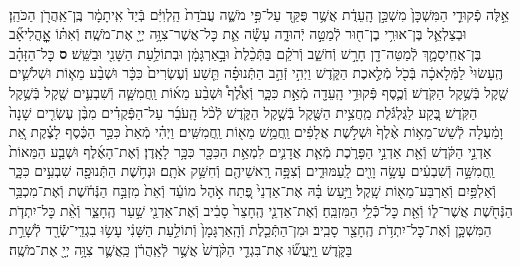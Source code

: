 \documentclass[twoside, openany, parskip=half, 11pt]{book}
\begin{document}
\begin{footnotesize}
\begin{multicols}{2}
\\
אֵ֣לֶּה פְֿקוּדֵ֤י הַמִּשְׁכָּן֙ מִשְׁכַּ֣ן הָֽעֵדֻ֔ת אֲשֶׁ֥ר פֻּקַּ֖ד עַל־פִּ֣י מֹשֶׁ֑ה עֲבֹדַת֙ הַֽלְוִיִּ֔ם בְּֿיַד֙ אִֽיתָמָ֔ר בֶּֽן־אַֽהֲרֹ֖ן הַכֹּהֵֽן׃ וּבְצַלְאֵ֛ל בֶּן־אוּרִ֥י בֶן־ח֖וּר לְֿמַטֵּ֣ה יְֿהוּדָ֑ה עָשָׂ֕ה אֵ֛ת כׇּל־אֲשֶׁר־צִוָּ֥ה יְיָ֖ אֶת־מֹשֶֽׁה׃ וְֿאִתּ֗וֹ אׇׇׇׇׇׇׇׇׇׇׇׇׇׇׇׇׇׇָֽהֳלִיאָ֞ב בֶּן־אֲחִֽיסָמָ֛ךְ לְֿמַטֵּה־דָ֖ן חָרָ֣שׁ וְֿחֹשֵׁ֑ב וְֿרֹקֵ֗ם בַּתְּֿכֵ֨לֶת֙ וּבָ֣אַרְגָּמָ֔ן וּבְתוֹלַ֥עַת הַשָּׁנִ֖י וּבַשֵּֽׁשׁ׃ \textbf{ס}  כׇּל־הַזָּהָ֗ב הֶֽעָשׂוּי֙ לַמְּֿלָאכָ֔ה בְּֿכֹ֖ל מְֿלֶ֣אכֶת הַקֹּ֑דֶשׁ וַיְהִ֣י זְֿהַ֣ב הַתְּֿנוּפָ֗ה תֵּ֤שַׁע וְֿעֶשְׂרִים֙ כִּכָּ֔ר וּשְׁבַ֨ע מֵא֧וֹת וּשְׁלֹשִׁ֛ים שֶׁ֖קֶל בְּֿשֶׁ֥קֶל הַקֹּֽדֶשׁ׃ וְֿכֶ֛סֶף פְּֿקוּדֵ֥י הָֽעֵדָ֖ה מְֿאַ֣ת כִּכָּ֑ר וְֿאֶ֩לֶף֩ וּשְׁבַ֨ע מֵא֜וֹת וַֽחֲמִשָּׁ֧ה וְֿשִׁבְעִ֛ים שֶׁ֖קֶל בְּֿשֶׁ֥קֶל הַקֹּֽדֶשׁ׃ בֶּ֚קַע לַגֻּלְגֹּ֔לֶת מַֽחֲצִ֥ית הַשֶּׁ֖קֶל בְּֿשֶׁ֣קֶל הַקֹּ֑דֶשׁ לְֿכֹ֨ל הָֽעֹבֵ֜ר עַל־הַפְּֿקֻדִ֗ים מִבֶּ֨ן עֶשְׂרִ֤ים שָׁנָה֙ וָמַ֔עְלָה לְֿשֵׁשׁ־מֵא֥וֹת אֶ֨לֶף֙ וּשְׁלֹ֣שֶׁת אֲלָפִ֔ים וַֽחֲמֵ֥שׁ מֵא֖וֹת וַֽחֲמִשִּֽׁים׃ וַיְהִ֗י מְֿאַת֙ כִּכַּ֣ר הַכֶּ֔סֶף לָצֶ֗קֶת אֵ֚ת אַדְנֵ֣י הַקֹּ֔דֶשׁ וְֿאֵ֖ת אַדְנֵ֣י הַפָּרֹ֑כֶת מְֿאַ֧ת אֲדָנִ֛ים לִמְאַ֥ת הַכִּכָּ֖ר כִּכָּ֥ר לָאָֽדֶן׃  וְֿאֶת־הָאֶ֜לֶף וּשְׁבַ֤ע הַמֵּאוֹת֙ וַֽחֲמִשָּׁ֣ה וְֿשִׁבְעִ֔ים עָשָׂ֥ה וָוִ֖ים לָֽעַמּוּדִ֑ים וְֿצִפָּ֥ה רָֽאשֵׁיהֶ֖ם וְֿחִשַּׁ֥ק אֹתָֽם׃ וּנְחֹ֥שֶׁת הַתְּֿנוּפָ֖ה שִׁבְעִ֣ים כִּכָּ֑ר וְֿאַלְפַּ֥יִם וְֿאַרְבַּע־מֵא֖וֹת שָֽׁקֶל׃ וַיַּ֣עַשׂ בָּ֗הּ אֶת־אַדְנֵי֙ פֶּ֚תַח אֹ֣הֶל מוֹעֵ֔ד וְֿאֵת֙ מִזְבַּ֣ח הַנְּֿחֹ֔שֶׁת וְֿאֶת־מִכְבַּ֥ר הַנְּֿחֹ֖שֶׁת אֲשֶׁר־ל֑וֹ וְֿאֵ֖ת כׇּל־כְּֿֿלֵ֥י הַמִּזְבֵּֽחַ׃ וְֿאֶת־אַדְנֵ֤י הֶֽחָצֵר֙ סָבִ֔יב וְֿאֶת־אַדְנֵ֖י שַׁ֣עַר הֶֽחָצֵ֑ר וְֿאֵ֨ת כׇּל־יִתְדֹ֧ת הַמִּשְׁכָּ֛ן וְֿאֶת־כׇּל־יִתְדֹ֥ת הֶֽחָצֵ֖ר סָבִֽיב׃ וּמִן־הַתְּֿכֵ֤לֶת וְֿהָֽאַרְגָּמָן֙ וְֿתוֹלַ֣עַת הַשָּׁנִ֔י עָשׂ֥וּ בִגְדֵֽי־שְֿֿׂרָ֖ד לְֿשָׁרֵ֣ת בַּקֹּ֑דֶשׁ וַֽיַּֽעֲשׂ֞וּ אֶת־בִּגְדֵ֤י הַקֹּ֨דֶשׁ֙ אֲשֶׁ֣ר לְֿאַֽהֲרֹ֔ן כַּֽאֲשֶׁ֛ר צִוָּ֥ה יְיָ֖ אֶת־מֹשֶֽׁה׃


\end{multicols}
\end{footnotesize}
\end{document}
